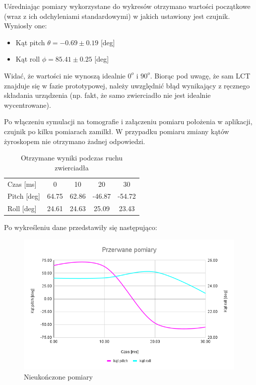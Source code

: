 Uśredniając pomiary wykorzystane do wykresów otrzymano wartości początkowe (wraz z ich odchyleniami standardowymi) w jakich ustawiony jest czujnik. Wyniosły one:

\begin{itemize}
    \item Kąt pitch $\theta = -0.69 \pm 0.19$ [deg]
    \item Kąt roll $\phi = 85.41 \pm 0.25$ [deg]
\end{itemize}

Widać, że wartości nie wynoszą idealnie $0^{o}$ i $90^{o}$. Biorąc pod uwagę, że sam LCT znajduje się w fazie prototypowej, należy uwzględnić błąd wynikający z ręcznego składania urządzenia (np. fakt, że samo zwierciadło nie jest idealnie wycentrowane).

Po włączeniu symulacji na tomografie i załączeniu pomiaru położenia w aplikacji, czujnik po kilku pomiarach zamilkł. W przypadku pomiaru zmiany kątów żyroskopem nie otrzymano żadnej odpowiedzi. 

\begin{table}[H]
    \centering
    \caption{Otrzymane wyniki podczas ruchu zwierciadła}
    \begin{tabular}{l|cccc}
        \toprule
            Czas [ms]  &     0 &    10 &     20 &     30 \\
            Pitch [deg] & 64.75 & 62.86 & -46.87 & -54.72 \\
            Roll [deg] & 24.61 & 24.63 &  25.09 &  23.43 \\
        \bottomrule
    \end{tabular}
    \label{tab:ruch_false}
\end{table}

\newpage

Po wykreśleniu dane przedstawiły się następująco:

\begin{figure}[H]
    \centering
    \includegraphics[width=\textwidth]{pictures/false.png}
    \caption{Nieukończone pomiary}
    \label{fig:false}
\end{figure}

